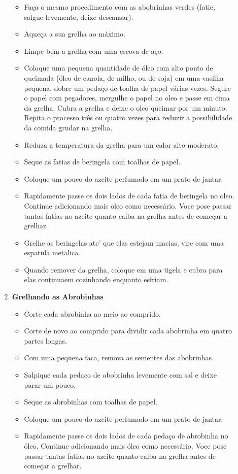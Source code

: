 \documentclass [11pt, letterpaper] {article}
\begin{document}
\begin{description}
\begin{enumerate}
\begin{itemize}
		\item Fa\c{c}a o mesmo procedimento com as abobrinhas verdes (fatie, salgue levemente, deixe descansar).
		\item Aque\c{c}a a sua grelha ao m\'aximo.
	 	\item Limpe bem a grelha com uma escova de a\c{c}o.
	 	\item Coloque uma pequena quantidade de \'oleo com alto ponto de queimada (\'oleo de canola, de milho, ou de soja) em uma vasilha pequena, dobre um peda\c{c}o de toalha de papel v\'arias vezes. Segure o papel com pegadores, mergulhe o papel no oleo e passe em cima da grelha. Cubra a grelha e deixe o oleo queimar por um minuto. Repita o processo tr\^es ou quatro vezes para reduzir a possibilidade da comida grudar na grelha.
		\item Reduza a temperatura da grelha para um calor alto moderato.
		\item Seque as fatias de beringela com toalhas de papel.
		\item Coloque um pouco do azeite perfumado em um prato de jantar.
		\item Rapidamente passe os dois lados de cada fatia de beringela no oleo. Continue adicionando mais oleo como necess\'ario. Voce pose passar tantas fatias no azeite quanto caiba na grelha antes de come\c{c}ar a grelhar.		
		\item Grelhe as beringelas ate' que elas estejam macias, vire com uma espatula metalica. 
		\item Quando remover da grelha, coloque em uma tigela e cubra para elas continuaem cozinhando enquanto esfriam.
	\end{itemize}
	\item {\bf Grelhando as Abrobinhas}
	\begin{itemize}			
		\item Corte cada abrobinha ao meio ao comprido.
		\item Corte de novo ao comprido para dividir cada abobrinha em quatro partes longas.
		\item Com uma pequena faca, remova as sementes das abobrinhas.
		\item Salpique cada pedaco de abobrinha levemente com sal e deixe parar um pouco.
		\item Seque as abrobinhas com toalhas de papel.
		\item Coloque um pouco do azeite perfumado em um prato de jantar.
		\item Rapidamente passe os dois lados de cada peda\c{c}o de abrobinha no \'oleo. Continue adicionando mais \'oleo como necess\'ario. Voce pose passar tantas fatias no azeite quanto caiba na grelha antes de come\c{c}ar a grelhar.		

\end{itemize}
\end{enumerate}
\end{description}
\end{document}
